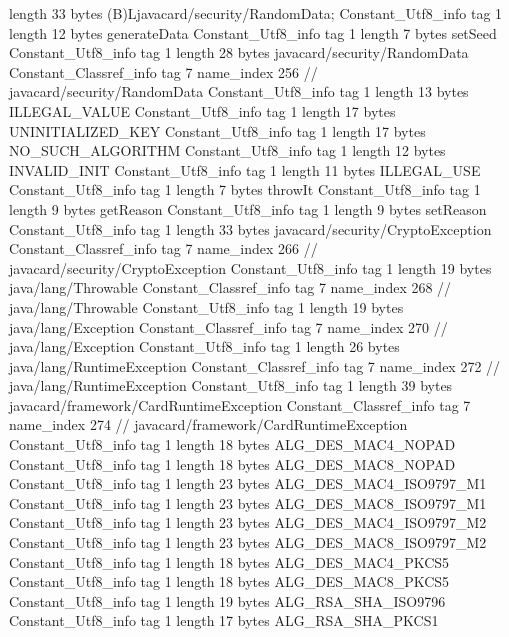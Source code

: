 {{{			length	33
			bytes	(B)Ljavacard/security/RandomData;
		}
		Constant_Utf8_info {
			tag	1
			length	12
			bytes	generateData
		}
		Constant_Utf8_info {
			tag	1
			length	7
			bytes	setSeed
		}
		Constant_Utf8_info {
			tag	1
			length	28
			bytes	javacard/security/RandomData
		}
		Constant_Classref_info {
			tag	7
			name_index	256		// javacard/security/RandomData
		}
		Constant_Utf8_info {
			tag	1
			length	13
			bytes	ILLEGAL_VALUE
		}
		Constant_Utf8_info {
			tag	1
			length	17
			bytes	UNINITIALIZED_KEY
		}
		Constant_Utf8_info {
			tag	1
			length	17
			bytes	NO_SUCH_ALGORITHM
		}
		Constant_Utf8_info {
			tag	1
			length	12
			bytes	INVALID_INIT
		}
		Constant_Utf8_info {
			tag	1
			length	11
			bytes	ILLEGAL_USE
		}
		Constant_Utf8_info {
			tag	1
			length	7
			bytes	throwIt
		}
		Constant_Utf8_info {
			tag	1
			length	9
			bytes	getReason
		}
		Constant_Utf8_info {
			tag	1
			length	9
			bytes	setReason
		}
		Constant_Utf8_info {
			tag	1
			length	33
			bytes	javacard/security/CryptoException
		}
		Constant_Classref_info {
			tag	7
			name_index	266		// javacard/security/CryptoException
		}
		Constant_Utf8_info {
			tag	1
			length	19
			bytes	java/lang/Throwable
		}
		Constant_Classref_info {
			tag	7
			name_index	268		// java/lang/Throwable
		}
		Constant_Utf8_info {
			tag	1
			length	19
			bytes	java/lang/Exception
		}
		Constant_Classref_info {
			tag	7
			name_index	270		// java/lang/Exception
		}
		Constant_Utf8_info {
			tag	1
			length	26
			bytes	java/lang/RuntimeException
		}
		Constant_Classref_info {
			tag	7
			name_index	272		// java/lang/RuntimeException
		}
		Constant_Utf8_info {
			tag	1
			length	39
			bytes	javacard/framework/CardRuntimeException
		}
		Constant_Classref_info {
			tag	7
			name_index	274		// javacard/framework/CardRuntimeException
		}
		Constant_Utf8_info {
			tag	1
			length	18
			bytes	ALG_DES_MAC4_NOPAD
		}
		Constant_Utf8_info {
			tag	1
			length	18
			bytes	ALG_DES_MAC8_NOPAD
		}
		Constant_Utf8_info {
			tag	1
			length	23
			bytes	ALG_DES_MAC4_ISO9797_M1
		}
		Constant_Utf8_info {
			tag	1
			length	23
			bytes	ALG_DES_MAC8_ISO9797_M1
		}
		Constant_Utf8_info {
			tag	1
			length	23
			bytes	ALG_DES_MAC4_ISO9797_M2
		}
		Constant_Utf8_info {
			tag	1
			length	23
			bytes	ALG_DES_MAC8_ISO9797_M2
		}
		Constant_Utf8_info {
			tag	1
			length	18
			bytes	ALG_DES_MAC4_PKCS5
		}
		Constant_Utf8_info {
			tag	1
			length	18
			bytes	ALG_DES_MAC8_PKCS5
		}
		Constant_Utf8_info {
			tag	1
			length	19
			bytes	ALG_RSA_SHA_ISO9796
		}
		Constant_Utf8_info {
			tag	1
			length	17
			bytes	ALG_RSA_SHA_PKCS1
}}}
